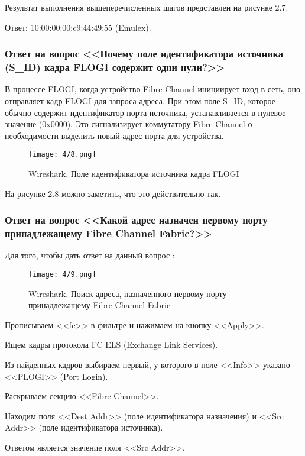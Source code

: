 Результат выполнения вышеперечисленных шагов представлен на рисунке 2.7.

Ответ: 10:00:00:00:c9:44:49:55 (Emulex).

\subsubsection{Ответ на вопрос <<Почему поле идентификатора источника (S\_ID)
    кадра FLOGI содержит одни нули?>>}

В процессе FLOGI, когда устройство Fibre Channel инициирует вход в сеть, оно
отправляет кадр FLOGI для запроса адреса. При этом поле S\_ID, которое обычно
содержит идентификатор порта источника, устанавливается в нулевое значение
(0x0000). Это сигнализирует коммутатору Fibre Channel о необходимости выделить
новый адрес порта для устройства.

\begin{figure}[ht]
    \centering\texttt{[image: 4/8.png]}
    \caption{Wireshark. Поле идентификатора источника кадра FLOGI}
\end{figure}

На рисунке 2.8 можно заметить, что это действительно так.

\subsubsection{Ответ на вопрос <<Какой адрес назначен первому порту
    принадлежащему Fibre Channel Fabric?>>}

Для того, чтобы дать ответ на данный вопрос \doing:

\begin{figure}[ht]
    \centering\texttt{[image: 4/9.png]}
    \caption{Wireshark. Поиск адреса, назначенного первому порту принадлежащему
        Fibre Channel Fabric}
\end{figure}

\begin{enumerate_num}
    \item Прописываем <<fc>> в фильтре и нажимаем на кнопку <<Apply>>.
    \item Ищем кадры протокола FC ELS (Exchange Link Services).
    \item Из найденных кадров выбираем первый, у которого в поле <<Info>>
    указано <<PLOGI>> (Port Login).
    \item Раскрываем секцию <<Fibre Channel>>.
    \item Находим поля <<Dest Addr>> (поле идентификатора назначения) и <<Src
    Addr>> (поле идентификатора источника).
    \item Ответом является значение поля <<Src Addr>>.
\end{enumerate_num}

